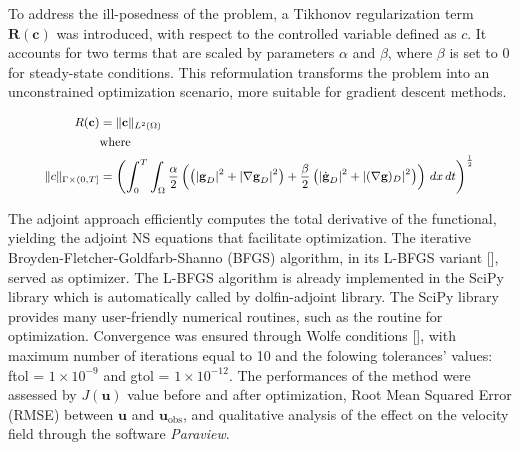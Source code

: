 To address the ill-posedness of the problem, a Tikhonov regularization term $\textbf{R}(\textbf{c})$ was introduced, with respect to the controlled variable defined as $c$. It accounts for two terms that are scaled by parameters \(\alpha\) and \(\beta\), where \(\beta\) is set to $0$ for steady-state conditions. This reformulation transforms the problem into an unconstrained optimization scenario, more suitable for gradient descent methods. 

\begin{equation}
\small
    \begin{aligned}
        R(\mathbf{c}) &= \| \mathbf{c} \|_{L^2(\Omega)} \\
        &\text{where} \\
        \small
        \|c\|_{\Gamma \times (0, T]} &= \left( \int_0^T \int_{\Omega} \frac{\alpha}{2} \left( \left(|\textbf{g}_D|^2 + |\nabla \textbf{g}_D|^2 \right) + \frac{\beta}{2} \left( |\dot{\textbf{g}}_D|^2 +  |(\nabla \textbf{g})_D|^2 \right) \right) \, dx \, dt \right)^{\frac{1}{2}}
    \end{aligned}
    \label{eq:12} 
\end{equation}

The adjoint approach efficiently computes the total derivative of the functional, yielding the adjoint NS equations that facilitate optimization. The iterative Broyden-Fletcher-Goldfarb-Shanno (BFGS) algorithm, in its L-BFGS variant [\cite{Liu1989}], served as optimizer. The L-BFGS algorithm is already implemented in the SciPy library which is automatically
called by dolfin-adjoint library. The SciPy library provides many user-friendly numerical routines, such as the routine for optimization. Convergence was ensured through Wolfe conditions [\cite{Nocedal2006}], with maximum number of iterations equal to 10 and the folowing tolerances' values: ftol = $1 \times 10^{-9}$ and gtol = $1 \times 10^{-12}$. %
The performances of the method were assessed by $J(\textbf{u})$ value before and after optimization, Root Mean Squared Error (RMSE) between \( \mathbf{u}\) and \( \mathbf{u}_{\text{obs}} \), and qualitative analysis of the effect on the velocity field through the software \emph{Paraview}.



